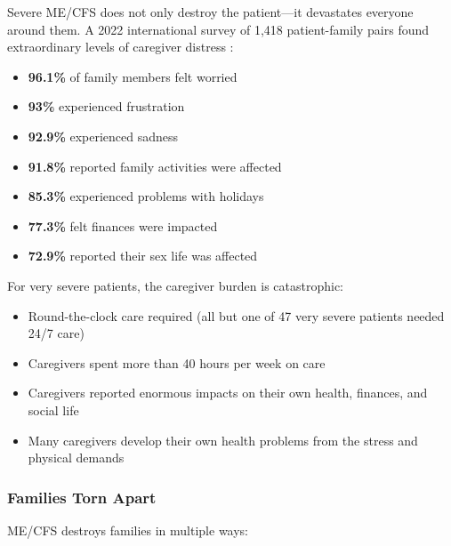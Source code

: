 Severe ME/CFS does not only destroy the patient---it devastates everyone around them. A 2022 international survey of 1,418 patient-family pairs found extraordinary levels of caregiver distress \cite{Vyas2022family}:

\begin{itemize}
    \item \textbf{96.1\%} of family members felt worried
    \item \textbf{93\%} experienced frustration
    \item \textbf{92.9\%} experienced sadness
    \item \textbf{91.8\%} reported family activities were affected
    \item \textbf{85.3\%} experienced problems with holidays
    \item \textbf{77.3\%} felt finances were impacted
    \item \textbf{72.9\%} reported their sex life was affected
\end{itemize}

For very severe patients, the caregiver burden is catastrophic:
\begin{itemize}
    \item Round-the-clock care required (all but one of 47 very severe patients needed 24/7 care)
    \item Caregivers spent more than 40 hours per week on care
    \item Caregivers reported enormous impacts on their own health, finances, and social life
    \item Many caregivers develop their own health problems from the stress and physical demands
\end{itemize}

\subsubsection{Families Torn Apart}
\label{subsec:families-torn}

ME/CFS destroys families in multiple ways:

